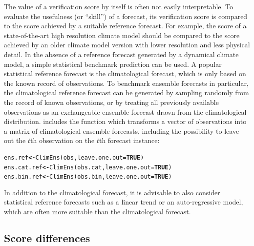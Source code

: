 \documentclass[article]{jss}\usepackage[]{graphicx}\usepackage[]{color}
\makeatletter
\newcommand{\hlnum}[1]{\textcolor[rgb]{0.502,0,0.502}{\textbf{#1}}}%
\newcommand{\hlstd}[1]{\textcolor[rgb]{0,0,0}{#1}}%
\newcommand{\hlkwb}[1]{\textcolor[rgb]{0.502,0.502,0.753}{\textbf{#1}}}%
\newcommand{\hlkwc}[1]{\textcolor[rgb]{0,0.502,0.753}{#1}}%
\newcommand{\hlkwd}[1]{\textcolor[rgb]{0,0.267,0.4}{#1}}%
\newenvironment{kframe}{%
 \def\at@end@of@kframe{}%
 \ifinner\ifhmode%
  \def\at@end@of@kframe{\end{minipage}}%
  \begin{minipage}{\columnwidth}%
 \fi\fi%
 \def\FrameCommand##1{\hskip\@totalleftmargin \hskip-\fboxsep
 \colorbox{shadecolor}{##1}\hskip-\fboxsep
     \hskip-\linewidth \hskip-\@totalleftmargin \hskip\columnwidth}%
 \MakeFramed {\advance\hsize-\width
   \@totalleftmargin\z@ \linewidth\hsize
   \@setminipage}}%
 {\par\unskip\endMakeFramed%
 \at@end@of@kframe}
\newenvironment{knitrout}{}{} %
\makeatother
\begin{document}
The value of a verification score by itself is often not easily interpretable.
To evaluate the usefulness (or ``skill'') of a forecast, its verification score is compared to the score achieved by a suitable reference forecast.
For example, the score of a state-of-the-art high resolution climate model should be compared to the score achieved by an older climate model version with lower resolution and less physical detail.
In the absence of a reference forecast generated by a dynamical climate model, a simple statistical benchmark prediction can be used.
A popular statistical reference forecast is the climatological forecast, which is only based on the known record of observations.
To benchmark ensemble forecasts in particular, the climatological reference forecast can be generated by sampling randomly from the record of known observations, or by treating all previously available observations as an exchangeable ensemble forecast drawn from the climatological distribution.
 includes the function  which transforms a vector of observations into a matrix of climatological ensemble forecasts, including the possibility to leave out the $t$th observation on the $t$th forecast instance:
%
\begin{knitrout}
\color{fgcolor}\begin{kframe}
\begin{alltt}
\hlstd{ens.ref}     \hlkwb{<-} \hlkwd{ClimEns}\hlstd{(obs,}     \hlkwc{leave.one.out}\hlstd{=}\hlnum{TRUE}\hlstd{)}
\hlstd{ens.cat.ref} \hlkwb{<-} \hlkwd{ClimEns}\hlstd{(obs.cat,} \hlkwc{leave.one.out}\hlstd{=}\hlnum{TRUE}\hlstd{)}
\hlstd{ens.bin.ref} \hlkwb{<-} \hlkwd{ClimEns}\hlstd{(obs.bin,} \hlkwc{leave.one.out}\hlstd{=}\hlnum{TRUE}\hlstd{)}
\end{alltt}
\end{kframe}
\end{knitrout}
%
In addition to the climatological forecast, it is advisable to also consider statistical reference forecasts such as a linear trend or an auto-regressive model, which are often more suitable than the climatological forecast.



\subsection{Score differences}
\end{document}
